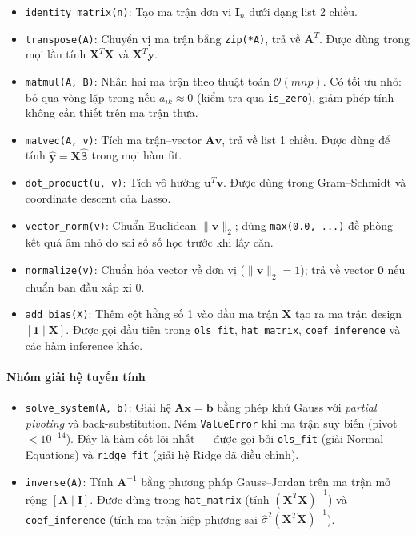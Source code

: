 \begin{itemize}
    \item \texttt{identity\_matrix(n)}: Tạo ma trận đơn vị $\mathbf{I}_n$ dưới dạng list 2 chiều.
    \item \texttt{transpose(A)}: Chuyển vị ma trận bằng \texttt{zip(*A)}, trả về $\mathbf{A}^T$. Được dùng trong mọi lần tính $\mathbf{X}^T\mathbf{X}$ và $\mathbf{X}^T\mathbf{y}$.
    \item \texttt{matmul(A, B)}: Nhân hai ma trận theo thuật toán $\mathcal{O}(mnp)$. Có tối ưu nhỏ: bỏ qua vòng lặp trong nếu $a_{ik} \approx 0$ (kiểm tra qua \texttt{is\_zero}), giảm phép tính không cần thiết trên ma trận thưa.
    \item \texttt{matvec(A, v)}: Tích ma trận--vector $\mathbf{A}\mathbf{v}$, trả về list 1 chiều. Được dùng để tính $\hat{\mathbf{y}} = \mathbf{X}\hat{\boldsymbol{\beta}}$ trong mọi hàm fit.
    \item \texttt{dot\_product(u, v)}: Tích vô hướng $\mathbf{u}^T\mathbf{v}$. Được dùng trong Gram--Schmidt và coordinate descent của Lasso.
    \item \texttt{vector\_norm(v)}: Chuẩn Euclidean $\|\mathbf{v}\|_2$; dùng \texttt{max(0.0, ...)} đề phòng kết quả âm nhỏ do sai số số học trước khi lấy căn.
    \item \texttt{normalize(v)}: Chuẩn hóa vector về đơn vị ($\|\mathbf{v}\|_2 = 1$); trả về vector $\mathbf{0}$ nếu chuẩn ban đầu xấp xỉ 0.
    \item \texttt{add\_bias(X)}: Thêm cột hằng số 1 vào đầu ma trận $\mathbf{X}$ tạo ra ma trận design $[\mathbf{1} \mid \mathbf{X}]$. Được gọi đầu tiên trong \texttt{ols\_fit}, \texttt{hat\_matrix}, \texttt{coef\_inference} và các hàm inference khác.
\end{itemize}

\paragraph{Nhóm giải hệ tuyến tính}

\begin{itemize}
    \item \texttt{solve\_system(A, b)}: Giải hệ $\mathbf{A}\mathbf{x} = \mathbf{b}$ bằng phép khử Gauss với \emph{partial pivoting} và back-substitution. Ném \texttt{ValueError} khi ma trận suy biến (pivot $< 10^{-14}$). Đây là hàm cốt lõi nhất --- được gọi bởi \texttt{ols\_fit} (giải Normal Equations) và \texttt{ridge\_fit} (giải hệ Ridge đã điều chỉnh).
    \item \texttt{inverse(A)}: Tính $\mathbf{A}^{-1}$ bằng phương pháp Gauss--Jordan trên ma trận mở rộng $[\mathbf{A} \mid \mathbf{I}]$. Được dùng trong \texttt{hat\_matrix} (tính $(\mathbf{X}^T\mathbf{X})^{-1}$) và \texttt{coef\_inference} (tính ma trận hiệp phương sai $\hat{\sigma}^2(\mathbf{X}^T\mathbf{X})^{-1}$).
\end{itemize}

